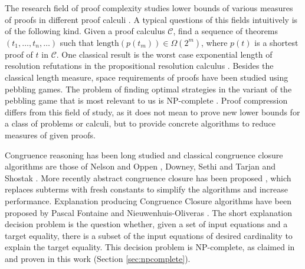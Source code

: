 The research field of proof complexity studies lower bounds of various measures of proofs in different proof calculi \cite{Arora2009,Beame1998a,Cook1979}. 
A typical questions of this fields intuitively is of the following kind. 
Given a proof calculus $\mathcal{C}$, find a sequence of theorems $(t_1,\ldots, t_n, \ldots)$ such that $\mathrm{length}(p(t_m)) \in \Omega(2^m)$, where $p(t)$ is a shortest proof of $t$ in $\mathcal{C}$.
One classical result is the worst case exponential length of resolution refutations in the propositional resolution calculus \cite{Arora2009}.
Besides the classical length measure, space requirements of proofs have been studied \cite{Ben-Sasson2002,Esteban2001,Hopcroft1977,Nordstroem2013,Sethi1975} using pebbling games.
The problem of finding optimal strategies in the variant of the pebbling game that is most relevant to us is NP-complete \cite{Sethi1975}.
Proof compression differs from this field of study, as it does not mean to prove new lower bounds for a class of problems or calculi, but to provide concrete algorithms to reduce measures of given proofs.

Congruence reasoning has been long studied and classical congruence closure algorithms are those of Nelson and Oppen \cite{Nelson1980}, Downey, Sethi and Tarjan \cite{Downey1980} and Shostak \cite{Shostak1978}.
More recently abstract congruence closure has been proposed \cite{Bachmair2000}, which replaces subterms with fresh constants to simplify the algorithms and increase performance.
Explanation producing Congruence Closure algorithms have been proposed by Pascal Fontaine \cite{Fontaine2004} and Nieuwenhuis-Oliveras \cite{Nieuwenhuis2007,Nieuwenhuis2005}.
The short explanation decision problem is the question whether, given a set of input equations and a target equality, there is a subset of the input equations of desired cardinality to explain the target equality.
This decision problem is NP-complete, as claimed in \cite{Nieuwenhuis2005,Nieuwenhuis2007} and proven in this work (Section \ref{sec:npcomplete}).

